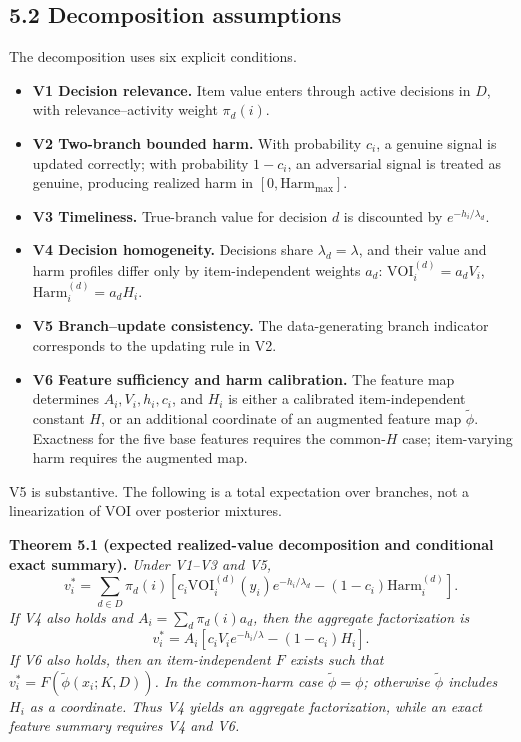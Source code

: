 \documentclass[
  11pt]{article}
\providecommand{\tightlist}{%
  \setlength{\itemsep}{0pt}\setlength{\parskip}{0pt}}
\begin{document}
\subsection{5.2 Decomposition assumptions}\label{decomposition-assumptions}

The decomposition uses six explicit conditions.

\begin{itemize}
\tightlist
\item
  \textbf{V1 Decision relevance.} Item value enters through active decisions in \(D\), with relevance--activity weight \(\pi_d(i)\).
\item
  \textbf{V2 Two-branch bounded harm.} With probability \(c_i\), a genuine signal is updated correctly; with probability \(1-c_i\), an adversarial signal is treated as genuine, producing realized harm in \([0,\mathrm{Harm}_{\max}]\).
\item
  \textbf{V3 Timeliness.} True-branch value for decision \(d\) is discounted by \(e^{-h_i/\lambda_d}\).
\item
  \textbf{V4 Decision homogeneity.} Decisions share \(\lambda_d=\lambda\), and their value and harm profiles differ only by item-independent weights \(a_d\): \(\mathrm{VOI}_i^{(d)}=a_dV_i\), \(\mathrm{Harm}_i^{(d)}=a_dH_i\).
\item
  \textbf{V5 Branch--update consistency.} The data-generating branch indicator corresponds to the updating rule in V2.
\item
  \textbf{V6 Feature sufficiency and harm calibration.} The feature map determines \(A_i,V_i,h_i,c_i\), and \(H_i\) is either a calibrated item-independent constant \(H\), or an additional coordinate of an augmented feature map \(\tilde\phi\). Exactness for the five base features requires the common-\(H\) case; item-varying harm requires the augmented map.
\end{itemize}

V5 is substantive. The following is a total expectation over branches, not a linearization of VOI over posterior mixtures.

\textbf{Theorem 5.1 (expected realized-value decomposition and conditional exact summary).} \emph{Under V1--V3 and V5,} \[
v_i^*=\sum_{d\in D}\pi_d(i)\left[
 c_i\mathrm{VOI}_i^{(d)}(y_i)e^{-h_i/\lambda_d}
 -(1-c_i)\mathrm{Harm}_i^{(d)}\right].
\tag{4}
\] \emph{If V4 also holds and \(A_i=\sum_d\pi_d(i)a_d\), then the aggregate factorization is} \[
v_i^*=A_i\left[c_iV_ie^{-h_i/\lambda}-(1-c_i)H_i\right].
\tag{5}
\] \emph{If V6 also holds, then an item-independent \(F\) exists such that \(v_i^*=F(\tilde\phi(x_i;K,D))\). In the common-harm case \(\tilde\phi=\phi\); otherwise \(\tilde\phi\) includes \(H_i\) as a coordinate. Thus V4 yields an aggregate factorization, while an exact feature summary requires V4 and V6.}
\end{document}
